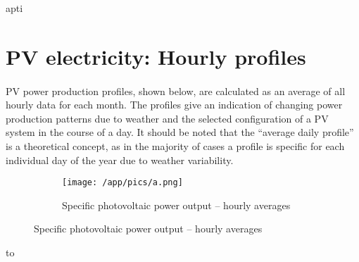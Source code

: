 apti     \documentclass[10pt,a4paper,UTF8]{article}
\begin{document}
{\section{ PV electricity: Hourly profiles }
\setcounter{figure}{0}
\setcounter{table}{0}

\paragraph{} PV power production profiles, shown below, are calculated as an average of all hourly data for each month. The profiles give an indication of changing power production patterns due to weather and the selected configuration of a PV system in the course of a day. It should be noted that the “average daily profile” is a theoretical concept, as in the majority of cases a profile is specific for each individual day of the year due to weather variability.%
\begin{figure}[H]  %
    
    \begin{figure}[H]
    \vspace*{-5mm}
    \caption{ Specific photovoltaic power output – hourly averages }
    \texttt{[image: /app/pics/a.png]}
    \end{figure}
    
\end{figure}\newpage%


%


 {\footnotesize 

     \begin{longtabu} to \textwidth{ X[1.2,C]X[1,C]X[1,C]X[1,C]X[1,C]X[1,C]X[1,C]X[1,C]X[1,C]X[1,C]X[1,C]X[1,C]X[1,C] }
    

\end{longtabu}}}
\end{document}
